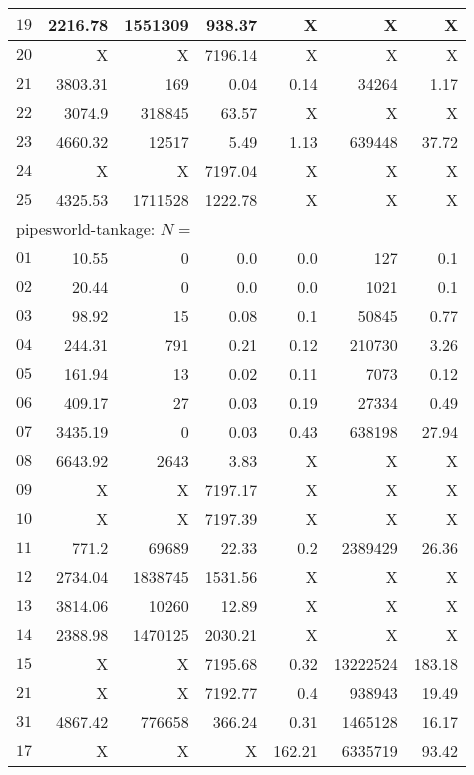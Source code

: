 \begin{longtable}{|c||r|r|r||r|r|r|}
$19$ & 2216.78 & 1551309 & 938.37 & X & X & X \\\hline
$20$ & X & X & 7196.14 & X & X & X \\\hline
$21$ & 3803.31 & 169 & 0.04 & 0.14 & 34264 & 1.17 \\\hline
$22$ & 3074.9 & 318845 & 63.57 & X & X & X \\\hline
$23$ & 4660.32 & 12517 & 5.49 & 1.13 & 639448 & 37.72 \\\hline
$24$ & X & X & 7197.04 & X & X & X \\\hline
$25$ & 4325.53 & 1711528 & 1222.78 & X & X & X \\\hline

\multicolumn{7}{|l|}{pipesworld-tankage: $N=$}\\\hline
$01$ & 10.55 & 0 & 0.0 & 0.0 & 127 & 0.1 \\\hline
$02$ & 20.44 & 0 & 0.0 & 0.0 & 1021 & 0.1 \\\hline
$03$ & 98.92 & 15 & 0.08 & 0.1 & 50845 & 0.77 \\\hline
$04$ & 244.31 & 791 & 0.21 & 0.12 & 210730 & 3.26 \\\hline
$05$ & 161.94 & 13 & 0.02 & 0.11 & 7073 & 0.12 \\\hline
$06$ & 409.17 & 27 & 0.03 & 0.19 & 27334 & 0.49 \\\hline
$07$ & 3435.19 & 0 & 0.03 & 0.43 & 638198 & 27.94 \\\hline
$08$ & 6643.92 & 2643 & 3.83 & X & X & X \\\hline
$09$ & X & X & 7197.17 & X & X & X \\\hline
$10$ & X & X & 7197.39 & X & X & X \\\hline
$11$ & 771.2 & 69689 & 22.33 & 0.2 & 2389429 & 26.36 \\\hline
$12$ & 2734.04 & 1838745 & 1531.56 & X & X & X \\\hline
$13$ & 3814.06 & 10260 & 12.89 & X & X & X \\\hline
$14$ & 2388.98 & 1470125 & 2030.21 & X & X & X \\\hline
$15$ & X & X & 7195.68 & 0.32 & 13222524 & 183.18 \\\hline
$21$ & X & X & 7192.77 & 0.4 & 938943 & 19.49 \\\hline
$31$ & 4867.42 & 776658 & 366.24 & 0.31 & 1465128 & 16.17 \\\hline
$17$ &  X &  X &  X & 162.21 & 6335719 & 93.42 \\\hline


\end{longtable}
